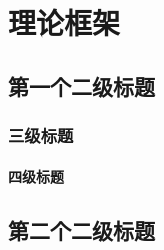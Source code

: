 \chapter{理论框架}
    \section{第一个二级标题}
        \subsection{三级标题}
            \subsubsection{四级标题}
    \section{第二个二级标题}